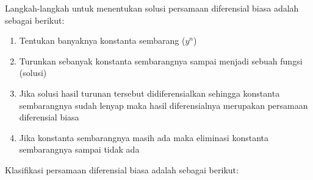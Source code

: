 Langkah-langkah untuk menentukan solusi persamaan diferensial biasa adalah sebagai berikut:

\begin{enumerate}[1.]

	\item Tentukan banyaknya konstanta sembarang (\begin{math} y^{n} \end{math})
	\item Turunkan sebanyak konstanta sembarangnya sampai menjadi sebuah fungsi (solusi)
	\item Jika solusi hasil turunan tersebut didiferensialkan sehingga konstanta sembarangnya sudah lenyap maka hasil diferensialnya merupakan persamaan diferensial biasa
	\item Jika konstanta sembarangnya masih ada maka eliminasi konstanta sembarangnya sampai tidak ada
	
\end{enumerate}

Klasifikasi persamaan diferensial biasa adalah sebagai berikut:

